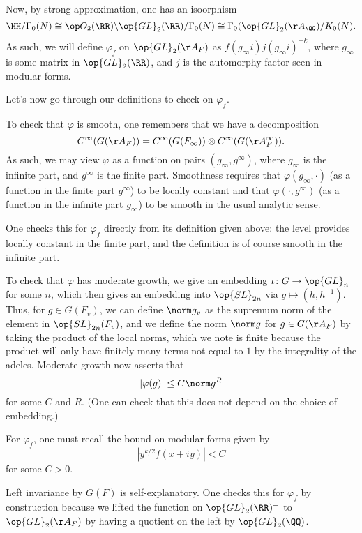 \documentclass{article}
\begin{document}
Now, by strong approximation, one has an isoorphism
\[\HH/\Gamma_0(N)\cong\op O_2(\RR)\backslash\op{GL}_2(\RR)/\Gamma_0(N)\cong\Gamma_0(\op{GL}_2(\AA_\QQ)/K_0(N).\]
As such, we will define $\varphi_f$ on $\op{GL}_2(\AA_F)$ as $f(g_\infty i)j(g_\infty i)^{-k}$, where $g_\infty$ is some matrix in $\op{GL}_2(\RR)$, and $j$ is the automorphy factor seen in modular forms.

Let's now go through our definitions to check on $\varphi_f$.
\begin{listalph}
	\item To check that $\varphi$ is smooth, one remembers that we have a decomposition
	\[C^\infty(G(\AA_F))=C^\infty(G(F_\infty))\otimes C^\infty(G(\AA_F^\infty)).\]
	As such, we may view $\varphi$ as a function on pairs $(g_\infty,g^\infty)$, where $g_\infty$ is the infinite part, and $g^\infty$ is the finite part. Smoothness requires that $\varphi(g_\infty,\cdot)$ (as a function in the finite part $g^\infty$) to be locally constant and that $\varphi(\cdot,g^\infty)$ (as a function in the infinite part $g_\infty$) to be smooth in the usual analytic sense.

	One checks this for $\varphi_f$ directly from its definition given above: the level provides locally constant in the finite part, and the definition is of course smooth in the infinite part.

	\item To check that $\varphi$ has moderate growth, we give an embedding $\iota\colon G\to\op{GL}_n$ for some $n$, which then gives an embedding into $\op{SL}_{2n}$ via $g\mapsto\left(h,h^{-1}\right)$. Thus, for $g\in G(F_v)$, we can define $\norm g_v$ as the supremum norm of the element in $\op{SL}_{2n}(F_v)$, and we define the norm $\norm g$ for $g\in G(\AA_F)$ by taking the product of the local norms, which we note is finite because the product will only have finitely many terms not equal to $1$ by the integrality of the adeles. Moderate growth now asserts that
	\[\left|\varphi(g)\right|\le C\norm g^R\]
	for some $C$ and $R$. (One can check that this does not depend on the choice of embedding.)

	For $\varphi_f$, one must recall the bound on modular forms given by
	\[\left|y^{k/2}f(x+iy)\right|<C\]
	for some $C>0$.

	\item Left invariance by $G(F)$ is self-explanatory. One checks this for $\varphi_f$ by construction because we lifted the function on $\op{GL}_2(\RR)^+$ to $\op{GL}_2(\AA_F)$ by having a quotient on the left by $\op{GL}_2(\QQ)$.


\end{listalph}
\end{document}
